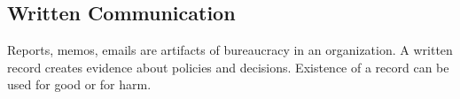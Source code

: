 \subsection{Written Communication}



Reports, memos, emails are artifacts of bureaucracy in an organization. A written record creates evidence about policies and decisions. Existence of a record can be used for good or for harm.

